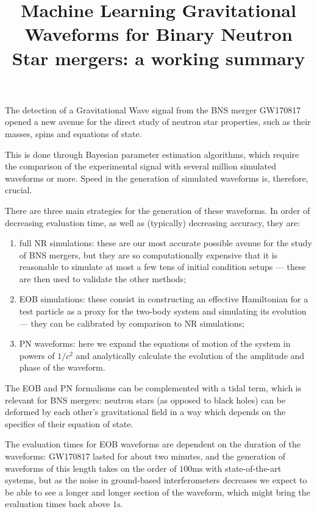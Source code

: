\documentclass[11pt]{article}
\title{Machine Learning Gravitational Waveforms for Binary Neutron Star mergers: a working summary}
\begin{document}
\maketitle

The detection of a Gravitational Wave signal from the \ac{BNS} merger GW170817 \cite[]{abbottGW170817ObservationGravitational2017} opened a new avenue for the direct study of neutron star properties, such as their masses, spins and equations of state.

This is done through Bayesian parameter estimation algorithms, which require the comparison of the experimental signal with several million \cite{lackeyEffectiveonebodyWaveformsBinary2017} simulated waveforms or more.
Speed in the generation of simulated waveforms is, therefore, crucial.

There are three main strategies for the generation of these waveforms. In order of decreasing evaluation time, as well as (typically) decreasing accuracy, they are:
\begin{enumerate}
    \item full \ac{NR} simulations: these are our most accurate possible avenue for the study of \ac{BNS} mergers, but they are so computationally expensive that it is reasonable to simulate at most a few tens of initial condition setups --- these are then used to validate the other methods;
    \item \ac{EOB} simulations: these consist in constructing an effective Hamiltonian for a test particle as a proxy for the two-body system and simulating its evolution --- they can be calibrated by comparison to \ac{NR} simulations;
    \item \ac{PN} waveforms: here we expand the equations of motion of the system in powers of $1/c^2$ and analytically calculate the evolution of the amplitude and phase of the waveform.
\end{enumerate}

The \ac{EOB} and \ac{PN} formalisms can be complemented with a tidal term, which is relevant for \ac{BNS} mergers: neutron stars (as opposed to black holes) can be deformed by each other's gravitational field in a way which depends on the specifics of their equation of state. 

The evaluation times for \ac{EOB} waveforms are dependent on the duration of the waveforms: GW170817 lasted for about two minutes, and the generation of waveforms of this length takes on the order of $100\text{ms}$ with state-of-the-art systems, but as the noise in ground-based interferometers decreases we expect to be able to see a longer and longer section of the waveform, which might bring the evaluation times back above $1\text{s}$. 
\end{document}
